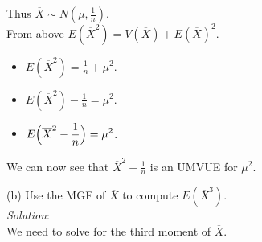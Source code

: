 \documentclass[12pt]{article}
\newcommand{\ds}{\displaystyle}
\begin{document}
Thus $ \ds \overline{X} \sim N(\mu,\frac{1}{n}) $. \\

From above $ \ds E(\overline{X}^{2}) = V(\overline{X}) + E(\overline{X})^{2} $.

\begin{itemize}
    \item $ \ds E(\overline{X}^{2}) = \frac{1}{n} + \mu^{2} $.
    \item $ \ds E(\overline{X}^{2}) - \frac{1}{n} = \mu^{2} $.
    \item $ \ds E\Bigl( \overline{X}^{2} - \frac{1}{n} \Bigr) = \mu^{2} $.
\end{itemize}

\noindent
We can now see that $ \ds \overline{X}^{2} - \frac{1}{n} $ is an UMVUE for $ \mu^{2} $. \\

\vspace{2.5mm}
\newpage

(b) Use the MGF of $ \overline{X} $ to compute $ E(\overline{X}^{3}) $.
\vspace{2.5mm} \\
\textit{Solution}:
\vspace{2.5mm} \\

\noindent
We need to solve for the third moment of $ \overline{X} $. \\
\end{document}
